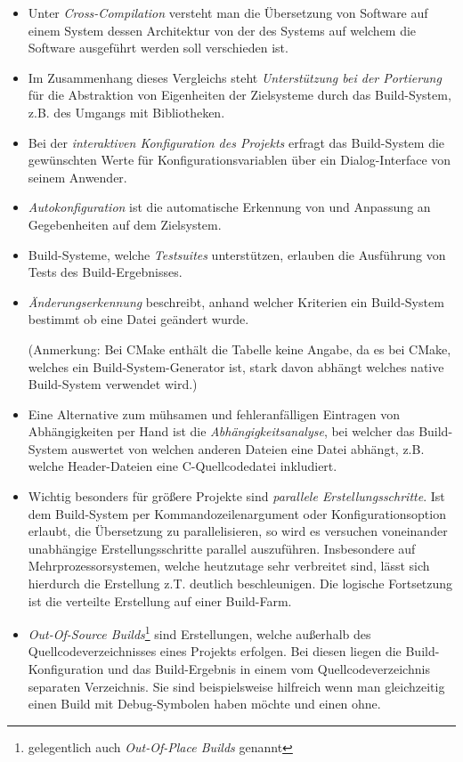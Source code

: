 \begin{itemize}
%
\item Unter \emph{Cross-Compilation} versteht man die Übersetzung von Software
auf einem System dessen Architektur von der des Systems auf welchem die Software
ausgeführt werden soll verschieden ist.
%
\item Im Zusammenhang dieses Vergleichs steht \emph{Unterstützung bei der
Portierung} für die Abstraktion von Eigenheiten der Zielsysteme durch das
Build-System, z.B. des Umgangs mit Bibliotheken.
%
\item Bei der \emph{interaktiven Konfiguration des Projekts} erfragt das
Build-System die gewünschten Werte für Konfigurationsvariablen über ein
Dialog-Interface von seinem Anwender.
%
\item \emph{Autokonfiguration} ist die automatische Erkennung von und Anpassung
an Gegebenheiten auf dem Zielsystem.
%
\item Build-Systeme, welche \emph{Testsuites} unterstützen, erlauben die
Ausführung von Tests des Build-Ergebnisses.
%
\item \emph{Änderungserkennung} beschreibt, anhand welcher Kriterien ein
Build-System bestimmt ob eine Datei geändert wurde.

(Anmerkung: Bei CMake enthält die Tabelle keine Angabe, da es bei CMake, welches
ein Build-System-Generator ist, stark davon abhängt welches native Build-System
verwendet wird.)
%
\item Eine Alternative zum mühsamen und fehleranfälligen Eintragen von
Abhängigkeiten per Hand ist die \emph{Abhängigkeitsanalyse}, bei welcher das
Build-System auswertet von welchen anderen Dateien eine Datei abhängt, z.B.
welche Header-Dateien eine C-Quellcodedatei inkludiert.
%
\item Wichtig besonders für größere Projekte sind \emph{parallele
Erstellungsschritte}. Ist dem Build-System per Kommandozeilenargument oder
Konfigurationsoption erlaubt, die Übersetzung zu parallelisieren, so wird es
versuchen voneinander unabhängige Erstellungsschritte parallel auszuführen.
Insbesondere auf Mehrprozessorsystemen, welche heutzutage sehr verbreitet sind,
lässt sich hierdurch die Erstellung z.T. deutlich beschleunigen. Die logische
Fortsetzung ist die verteilte Erstellung auf einer Build-Farm.
%
\item \emph{Out-Of-Source Builds}\footnote{gelegentlich auch \emph{Out-Of-Place
Builds} genannt} sind Erstellungen, welche außerhalb des Quellcodeverzeichnisses
eines Projekts erfolgen. Bei diesen liegen die Build-Konfiguration und das
Build-Ergebnis in einem vom Quellcodeverzeichnis separaten Verzeichnis. Sie sind
beispielsweise hilfreich wenn man gleichzeitig einen Build mit Debug-Symbolen
haben möchte und einen ohne.
%
\end{itemize}

